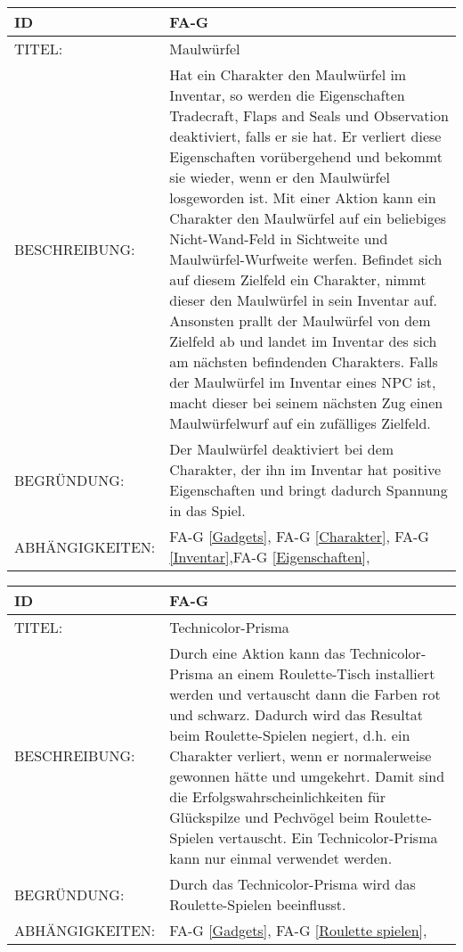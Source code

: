 \begin{tabularx}{16cm}{l|X}
	{table}\label{Maulwuerfel}
	\textbf{ID} & \textbf{FA-G \arabic{table}} \\
	\hline
	TITEL: & Maulwürfel \\
	\hline
	BESCHREIBUNG: & Hat ein Charakter den Maulwürfel im Inventar, so werden die Eigenschaften Tradecraft, Flaps and Seals und Observation deaktiviert, falls er sie hat. Er verliert diese Eigenschaften vorübergehend und bekommt sie wieder, wenn er den Maulwürfel losgeworden ist. Mit einer Aktion kann ein Charakter den Maulwürfel auf ein beliebiges Nicht-Wand-Feld in Sichtweite und Maulwürfel-Wurfweite werfen. Befindet sich auf diesem Zielfeld ein Charakter, nimmt dieser den Maulwürfel in sein Inventar auf. Ansonsten prallt der Maulwürfel von dem Zielfeld ab und landet im Inventar des sich am nächsten befindenden Charakters. Falls der Maulwürfel im Inventar eines NPC ist, macht dieser bei seinem nächsten Zug einen Maulwürfelwurf auf ein zufälliges Zielfeld. \\
	\hline
	BEGRÜNDUNG: &  Der Maulwürfel deaktiviert bei dem Charakter, der ihn im Inventar hat positive Eigenschaften und bringt dadurch Spannung in das Spiel. \\
	\hline
	ABHÄNGIGKEITEN: & FA-G \ref{Gadgets}, FA-G \ref{Charakter}, FA-G \ref{Inventar},FA-G \ref{Eigenschaften}, \todo[inline]{Maulwürfel-Wurfweite} \\
\end{tabularx}

\begin{tabularx}{16cm}{l|X}
	{table}\label{Technicolor-Prisma}
	\textbf{ID} & \textbf{FA-G \arabic{table}} \\
	\hline
	TITEL: & Technicolor-Prisma \\
	\hline
	BESCHREIBUNG: & Durch eine Aktion kann das Technicolor-Prisma an einem Roulette-Tisch installiert werden und vertauscht dann die Farben rot und schwarz. Dadurch wird das Resultat beim Roulette-Spielen negiert, d.h. ein Charakter verliert, wenn er normalerweise gewonnen hätte und umgekehrt. Damit sind die Erfolgswahrscheinlichkeiten für Glückspilze und Pechvögel beim Roulette-Spielen vertauscht. Ein Technicolor-Prisma kann nur einmal verwendet werden. \\
	\hline
	BEGRÜNDUNG: &  Durch das Technicolor-Prisma wird das Roulette-Spielen beeinflusst. \\
	\hline
	ABHÄNGIGKEITEN: & FA-G \ref{Gadgets}, FA-G \ref{Roulette spielen}, \\
\end{tabularx}


